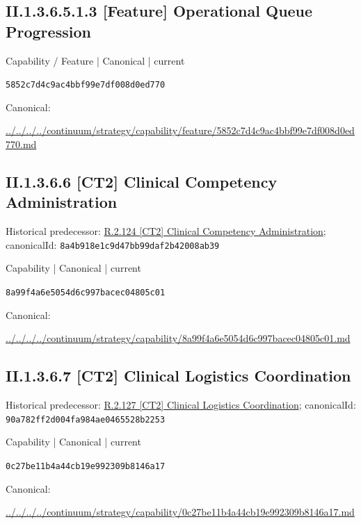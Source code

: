 \documentclass[10pt,a4paper]{article}
\begin{document}
\subsection*{II.1.3.6.5.1.3 [Feature] Operational Queue Progression}
\label{element-5852c7d4c9ac4bbf99e7df008d0ed770}
{\small Capability / Feature | Canonical | current}\par
\texttt{5852c7d4c9ac4bbf99e7df008d0ed770}\par
Canonical: \par
{\footnotesize\url{../../../../continuum/strategy/capability/feature/5852c7d4c9ac4bbf99e7df008d0ed770.md}}\par
\subsection*{II.1.3.6.6 [CT2] Clinical Competency Administration}
Historical predecessor: \hyperref[element-8a4b918e1c9d47bb99daf2b42008ab39]{R.2.124 [CT2] Clinical Competency Administration}; canonicalId: \texttt{8a4b918e1c9d47bb99daf2b42008ab39}\par
\label{element-8a99f4a6e5054d6c997bacec04805c01}
{\small Capability | Canonical | current}\par
\texttt{8a99f4a6e5054d6c997bacec04805c01}\par
Canonical: \par
{\footnotesize\url{../../../../continuum/strategy/capability/8a99f4a6e5054d6c997bacec04805c01.md}}\par
\subsection*{II.1.3.6.7 [CT2] Clinical Logistics Coordination}
Historical predecessor: \hyperref[element-90a782ff2d004fa984ae0465528b2253]{R.2.127 [CT2] Clinical Logistics Coordination}; canonicalId: \texttt{90a782ff2d004fa984ae0465528b2253}\par
\label{element-0c27be11b4a44cb19e992309b8146a17}
{\small Capability | Canonical | current}\par
\texttt{0c27be11b4a44cb19e992309b8146a17}\par
Canonical: \par
{\footnotesize\url{../../../../continuum/strategy/capability/0c27be11b4a44cb19e992309b8146a17.md}}\par
\end{document}
